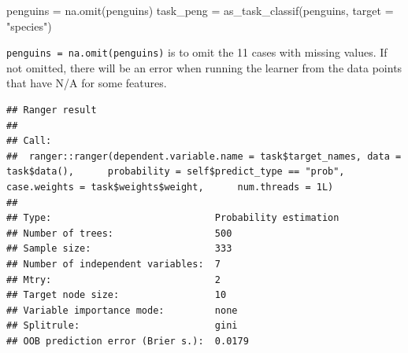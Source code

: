 \documentclass[
]{scrbook}
\newenvironment{Shaded}{\begin{snugshade}}{\end{snugshade}}
\newcommand{\AttributeTok}[1]{\textcolor[rgb]{0.77,0.63,0.00}{#1}}
\newcommand{\FunctionTok}[1]{\textcolor[rgb]{0.00,0.00,0.00}{#1}}
\newcommand{\NormalTok}[1]{#1}
\newcommand{\OtherTok}[1]{\textcolor[rgb]{0.56,0.35,0.01}{#1}}
\newcommand{\SpecialCharTok}[1]{\textcolor[rgb]{0.00,0.00,0.00}{#1}}
\newcommand{\StringTok}[1]{\textcolor[rgb]{0.31,0.60,0.02}{#1}}
\renewenvironment{Shaded} {\begin{snugshade}\small} {\end{snugshade}}
\begin{document}
\begin{Shaded}
\begin{Highlighting}[]
\NormalTok{penguins }\OtherTok{=} \FunctionTok{na.omit}\NormalTok{(penguins)}
\NormalTok{task\_peng }\OtherTok{=} \FunctionTok{as\_task\_classif}\NormalTok{(penguins, }\AttributeTok{target =} \StringTok{"species"}\NormalTok{)}
\end{Highlighting}
\end{Shaded}

\texttt{penguins\ =\ na.omit(penguins)} is to omit the 11 cases with missing values.
If not omitted, there will be an error when running the learner from the data points that have N/A for some features.

\begin{Shaded}
\end{Shaded}

\begin{verbatim}
## Ranger result
## 
## Call:
##  ranger::ranger(dependent.variable.name = task$target_names, data = task$data(),      probability = self$predict_type == "prob", case.weights = task$weights$weight,      num.threads = 1L) 
## 
## Type:                             Probability estimation 
## Number of trees:                  500 
## Sample size:                      333 
## Number of independent variables:  7 
## Mtry:                             2 
## Target node size:                 10 
## Variable importance mode:         none 
## Splitrule:                        gini 
## OOB prediction error (Brier s.):  0.0179
\end{verbatim}

\begin{Shaded}
\end{Shaded}
\end{document}
